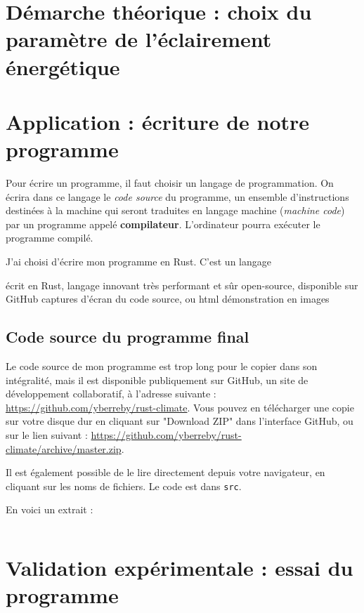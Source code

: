 \documentclass[12pt]{article}
\begin{document}
\section{Démarche théorique : choix du paramètre de l'éclairement énergétique}

\section{Application : écriture de notre programme}
Pour écrire un programme, il faut choisir un langage de programmation. On écrira dans ce langage le \textit{code source} du programme, un ensemble d'instructions destinées à la machine qui seront traduites en langage machine (\textit{machine code}) par un programme appelé \textbf{compilateur}. L'ordinateur pourra exécuter le programme compilé.

J'ai choisi d'écrire mon programme en Rust. C'est un langage

écrit en Rust, langage innovant très performant et sûr
open-source, disponible sur GitHub
captures d'écran du code source, ou html
démonstration en images


\subsection{Code source du programme final}
Le code source de mon programme est trop long pour le copier dans son intégralité, mais il est disponible publiquement sur GitHub, un site de développement collaboratif, à l'adresse suivante : \url{https://github.com/yberreby/rust-climate}. Vous pouvez en télécharger une copie sur votre disque dur en cliquant sur "Download ZIP" dans l'interface GitHub, ou sur le lien suivant : \url{https://github.com/yberreby/rust-climate/archive/master.zip}.

Il est également possible de le lire directement depuis votre navigateur, en cliquant sur les noms de fichiers. Le code est dans \texttt{src}.

En voici un extrait :

\inputminted[linenos]{rust}{temperature.rs}

\section{Validation expérimentale : essai du programme}
\end{document}
